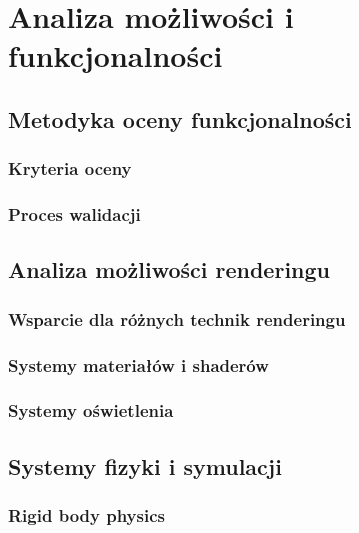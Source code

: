 \clearpage
\section{Analiza możliwości i funkcjonalności}

\subsection{Metodyka oceny funkcjonalności}
\subsubsection{Kryteria oceny}

\subsubsection{Proces walidacji}

\subsection{Analiza możliwości renderingu}
\subsubsection{Wsparcie dla różnych technik renderingu}

\subsubsection{Systemy materiałów i shaderów}

\subsubsection{Systemy oświetlenia}

\subsection{Systemy fizyki i symulacji}
\subsubsection{Rigid body physics}

